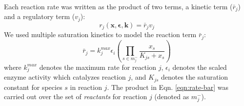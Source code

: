\documentclass[12pt]{article}
\begin{document}
Each reaction rate was written as the product of two terms, a kinetic term ($\bar{r}_{j}$) and a regulatory term ($v_{j}$):
\begin{equation}\label{eqn:rate-factor}
	r_{j}\left(\mathbf{x},\mathbf{\epsilon},\mathbf{k}\right) = \bar{r}_{j}v_{j}
\end{equation}
We used multiple saturation kinetics to model the reaction term $\bar{r}_{j}$:
\begin{equation}\label{eqn:rate-bar}
	\bar{r}_{j} = k_{j}^{max}\epsilon_{i}\left(\prod_{s\in{m_{j}^{-}}}\frac{x_{s}}{K_{js} + x_{s}}\right)
\end{equation}where $k_{j}^{max}$ denotes the maximum rate for reaction $j$, $\epsilon_{i}$ denotes the scaled enzyme activity which catalyzes reaction $j$, and
$K_{js}$ denotes the saturation constant for species $s$ in reaction $j$. 
The product in Eqn. \eqref{eqn:rate-bar} was carried out over the set of \textit{reactants} for reaction $j$ (denoted as $m_{j}^{-}$). 
\end{document}

